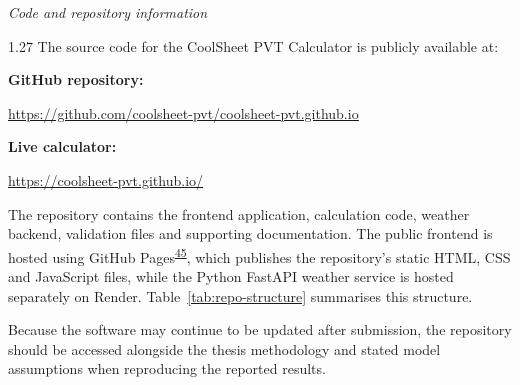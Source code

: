 \documentclass[12pt,letterpaper]{article}
\newcommand{\weblink}[1]{\textcolor{blue}{\underline{\url{#1}}}}
\DeclareRobustCommand{\citenum}[1]{\hyperlink{ref:#1}{#1}} %
\newcommand{\referenceheading}[1]{\vspace{1.55em}\textit{#1}\par\vspace{0.45em}}
\begin{document}
\referenceheading{Code and repository information}

\begin{spacing}{1.27}
The source code for the CoolSheet PVT Calculator is publicly available at:\par

\vspace{0.12in}

\textbf{GitHub repository:}\par
\weblink{https://github.com/coolsheet-pvt/coolsheet-pvt.github.io}\par

\vspace{0.12in}

\textbf{Live calculator:}\par
\weblink{https://coolsheet-pvt.github.io/}\par

\vspace{0.12in}

The repository contains the frontend application, calculation code, weather backend, validation files and supporting documentation. The public frontend is hosted using GitHub Pages\textsuperscript{\citenum{45}}, which publishes the repository's static HTML, CSS and JavaScript files, while the Python FastAPI weather service is hosted separately on Render. Table~\ref{tab:repo-structure} summarises this structure.\par

\vspace{0.12in}

Because the software may continue to be updated after submission, the repository should be accessed alongside the thesis methodology and stated model assumptions when reproducing the reported results.
\end{spacing}

\vspace{0.25in}
\end{document}
